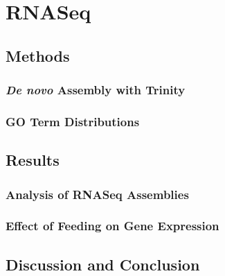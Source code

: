 \section{RNASeq}

\subsection{Methods}

\subsubsection{\emph{De novo} Assembly with Trinity}

\subsubsection{GO Term Distributions}

\subsection{Results}

\subsubsection{Analysis of RNASeq Assemblies}

\subsubsection{Effect of Feeding on Gene Expression}

\subsection{Discussion and Conclusion}